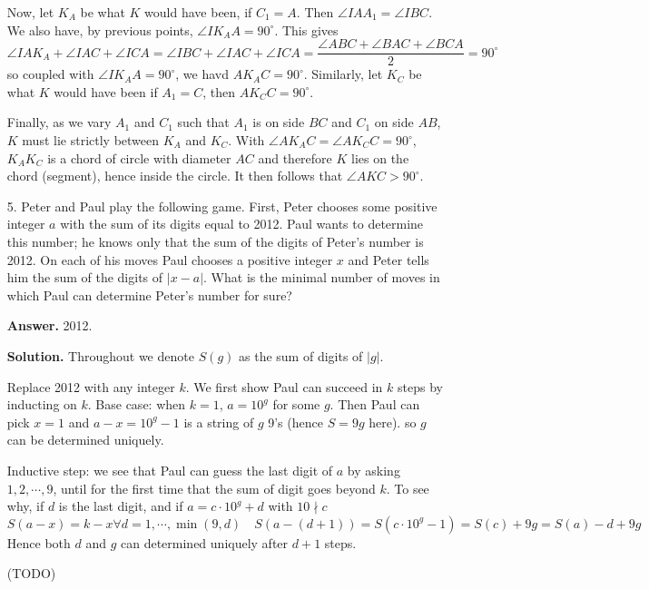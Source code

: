 \documentclass[11pt,a4paper]{article}
\begin{document}
\begin{enumerate}
	Now, let $K_A$ be what $K$ would have been, if $C_1=A$. 
	Then $\angle IAA_1=\angle IBC$. 
	We also have, by previous points, $\angle IK_AA=90^{\circ}$. 
	This gives 
	\[
	\angle IAK_A+\angle IAC+\angle ICA = 
	\angle IBC + \angle IAC+\angle ICA 
	=\frac{\angle ABC+\angle BAC+\angle BCA}{2}
	=90^{\circ}
	\]
	so coupled with $\angle IK_AA=90^{\circ}$, 
	we havd $AK_AC=90^{\circ}$. 
	Similarly, let $K_C$ be what $K$ would have been if $A_1=C$, then $AK_CC=90^{\circ}$. 
	
	Finally, as we vary $A_1$ and $C_1$ such that $A_1$ is on side $BC$ and $C_1$ on side $AB$, 
	$K$ must lie strictly between $K_A$ and $K_C$. 
	With $\angle AK_AC=\angle AK_CC=90^{\circ}$, 
	$K_AK_C$ is a chord of circle with diameter $AC$ and therefore 
	$K$ lies on the chord (segment), hence inside the circle. 
	It then follows that $\angle AKC>90^{\circ}$. 
	
	\item[5.] 
	Peter and Paul play the following game. First, Peter chooses some positive integer $a$ with
	the sum of its digits equal to 2012. Paul wants to determine this number; he knows only
	that the sum of the digits of Peter’s number is 2012. On each of his moves Paul chooses a
	positive integer $x$ and Peter tells him the sum of the digits of $|x - a|$. What is the minimal
	number of moves in which Paul can determine Peter’s number for sure?
	
	\textbf{Answer.} 2012. 
	
	\textbf{Solution.} Throughout we denote $S(g)$ as the sum of digits of $|g|$. 
	
	Replace 2012 with any integer $k$. 
	We first show Paul can succeed in $k$ steps by inducting on $k$. 
	Base case: when $k=1$, $a=10^g$ for some $g$. 
	Then Paul can pick $x=1$ and $a-x=10^g-1$ is a string of $g$ 9's (hence $S=9g$ here). 
	so $g$ can be determined uniquely. 
	
	Inductive step: we see that Paul can guess the last digit of $a$ by asking $1, 2, \cdots, 9$, until for the first time that the sum of digit goes beyond $k$. 
	To see why, if $d$ is the last digit, and if $a=c\cdot 10^g+d$ with $10\nmid c$
	\[
	S(a-x) = k - x\forall d=1, \cdots, \min(9, d)
	\quad 
	S(a-(d+1)) = S(c\cdot 10^g - 1) = S(c) + 9g = S(a) - d + 9g
	\]
	Hence both $d$ and $g$ can determined uniquely after $d+1$ steps. 
	
	(TODO)
\end{enumerate}
\end{document}
